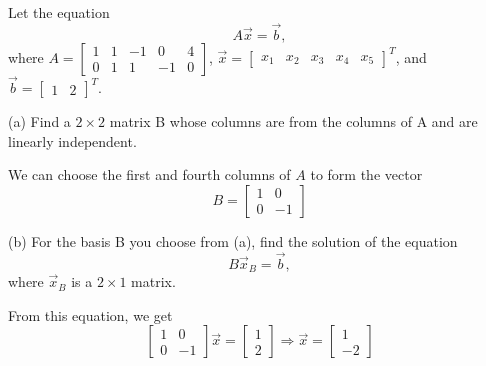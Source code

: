\documentclass[12pt]{extarticle}
\theoremstyle{definition}
\begin{document}
\begin{problem}
Let the equation 
\[A\vec{x}=\vec{b},\]
where $A=\begin{bmatrix}
1&1&-1&0&4\\0&1&1&-1&0
\end{bmatrix}$, $\vec{x}=\begin{bmatrix}
x_1&x_2&x_3&x_4&x_5
\end{bmatrix}^T$, and $\vec{b}=\begin{bmatrix}
1&2
\end{bmatrix}^T$.

\begin{description}
	\item{(a)} Find a $2\times 2$ matrix B whose columns are from the columns of A and are linearly independent.

		We can choose the first and fourth columns of $A$ to form the 
		vector $$B = \begin{bmatrix} 1 & 0\\ 0 & -1\end{bmatrix}$$

	\item{(b)} For the basis B you choose from (a), find the solution of the equation 
	\[B\vec{x}_B=\vec{b},\]
	where $\vec{x}_B$ is a $2\times 1$ matrix.

	From this equation, we get $$\begin{bmatrix} 1 & 0\\ 0 & -1\end{bmatrix}\vec{x} = \begin{bmatrix} 1\\ 2 \end{bmatrix} 
	\Longrightarrow \vec{x} = \begin{bmatrix} 1 \\ -2\end{bmatrix}$$

\end{description}
\end{problem}
\end{document}
